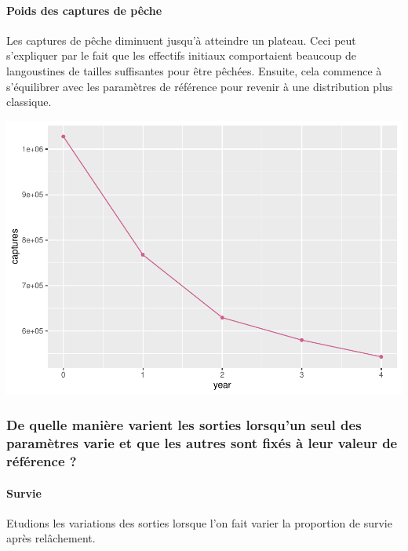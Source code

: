 \documentclass[
]{article}
\begin{document}
\hypertarget{poids-des-captures-de-puxeache}{%
\paragraph{Poids des captures de
pêche}\label{poids-des-captures-de-puxeache}}

Les captures de pêche diminuent jusqu'à atteindre un plateau. Ceci peut
s'expliquer par le fait que les effectifs initiaux comportaient beaucoup
de langoustines de tailles suffisantes pour être pêchées. Ensuite, cela
commence à s'équilibrer avec les paramètres de référence pour revenir à
une distribution plus classique.

\includegraphics{rapport_files/figure-latex/refc-1.pdf}

\hypertarget{de-quelle-maniuxe8re-varient-les-sorties-lorsquun-seul-des-paramuxe8tres-varie-et-que-les-autres-sont-fixuxe9s-uxe0-leur-valeur-de-ruxe9fuxe9rence}{%
\subsubsection{De quelle manière varient les sorties lorsqu'un seul des
paramètres varie et que les autres sont fixés à leur valeur de référence
?}\label{de-quelle-maniuxe8re-varient-les-sorties-lorsquun-seul-des-paramuxe8tres-varie-et-que-les-autres-sont-fixuxe9s-uxe0-leur-valeur-de-ruxe9fuxe9rence}}

\hypertarget{survie}{%
\paragraph{Survie}\label{survie}}

Etudions les variations des sorties lorsque l'on fait varier la
proportion de survie après relâchement.
\end{document}
